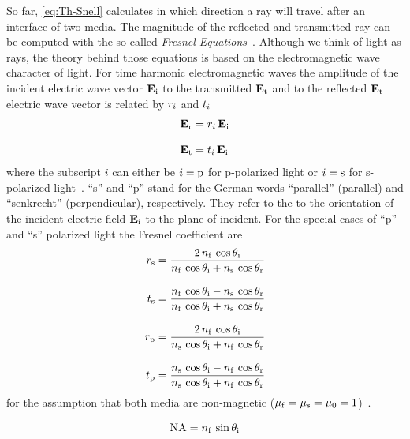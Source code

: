 So far, \cref{eq:Th-Snell} calculates in which direction a ray will travel 
after an interface of two media. The magnitude of the reflected and transmitted 
ray can be computed with the so called \emph{Fresnel 
Equations}~\cite{Jackson2013,Born1980Ch1}. Although we think of light as rays, 
the theory behind those equations is based on the electromagnetic wave 
character of light. For time harmonic electromagnetic waves the amplitude of 
the incident electric wave vector $\vb{E}_{\mathrm{i}}$ to the transmitted 
$\vb{E}_{\mathrm{t}}$ and to the reflected $\vb{E}_{\mathrm{t}}$ electric wave vector 
is related by $r_{i}$ and $t_{i}$
\begin{subequations}
\begin{align}
  \vb{E}_{\mathrm{r}} & =r_{i}\,\vb{E}_{\mathrm{i}} \\[3mm]
  \vb{E}_{\mathrm{t}} & =t_{i}\,\vb{E}_{\mathrm{i}}
\end{align}
\end{subequations}
where the subscript $i$ can either be $i=\mathrm{p}$ for p-polarized light or 
$i=\mathrm{s}$ for s-polarized light~\cite{Jackson2013,Born1980Ch1}. ``s'' and 
``p'' stand for the German words ``parallel'' (parallel) and ``senkrecht'' 
(perpendicular), respectively. They refer to the to the orientation of the 
incident electric field $\vb{E}_{\mathrm{i}}$ to the plane of incident. For the 
special cases of ``p'' and ``s'' polarized light the Fresnel coefficient are 
\begin{subequations}
\begin{align}
  r_{\mathrm{s}} & =
  \frac{2\,n_{\mathrm{f}}\,\cos\theta_{\mathrm{i}}}{n_{\mathrm{f}}\,\cos\theta_{\mathrm{i}} + n_{\mathrm{s}}\,\cos\theta_{\mathrm{r}}} 
  \label{eq:th-fresnel-rs}\\[3mm]
  t_{\mathrm{s}} & = \frac{n_{\mathrm{f}}\,\cos\theta_{\mathrm{i}} - 
  n_{\mathrm{s}}\,\cos\theta_{\mathrm{r}}}{n_{\mathrm{f}}\,\cos\theta_{\mathrm{i}} + n_{\mathrm{s}}\,\cos\theta_{\mathrm{r}}} 
  \label{eq:th-fresnel-ts}\\[3mm]
  r_{\mathrm{p}} & =
  \frac{2\,n_{\mathrm{f}}\,\cos\theta_{\mathrm{i}}}{n_{\mathrm{s}}\,\cos\theta_{\mathrm{i}} + n_{\mathrm{f}}\,\cos\theta_{\mathrm{r}}} 
  \label{eq:th-fresnel-rp}\\[3mm]
  t_{\mathrm{p}} & = \frac{n_{\mathrm{s}}\,\cos\theta_{\mathrm{i}} - 
  n_{\mathrm{f}}\,\cos\theta_{\mathrm{r}}}{n_{\mathrm{s}}\,\cos\theta_{\mathrm{i}} + n_{\mathrm{f}}\,\cos\theta_{\mathrm{r}}}
\label{eq:th-fresnel-tp}
\end{align}
\end{subequations}
for the assumption that both media are non-magnetic ($\mu_{\mathrm{f}} = 
\mu_{\mathrm{s}} = \mu_{0} = 1$)~\cite{Born1980Ch1}.



\begin{equation}
  \text{NA} = n_{\mathrm{f}}\,\sin\theta_{\mathrm{i}}
  \label{eq:Th-NA}
\end{equation}

